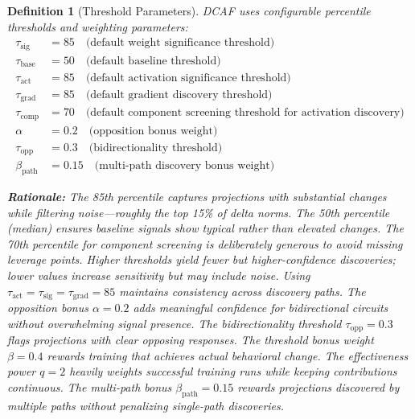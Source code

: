 \documentclass[11pt]{article}
\newtheorem{definition}{Definition}[section]
\begin{document}
\begin{definition}[Threshold Parameters]
\label{def:threshold-parameters}
DCAF uses configurable percentile thresholds and weighting parameters:
\begin{align}
\tau_{\text{sig}} &= 85 \quad \text{(default weight significance threshold)} \\
\tau_{\text{base}} &= 50 \quad \text{(default baseline threshold)} \\
\tau_{\text{act}} &= 85 \quad \text{(default activation significance threshold)} \\
\tau_{\text{grad}} &= 85 \quad \text{(default gradient discovery threshold)} \\
\tau_{\text{comp}} &= 70 \quad \text{(default component screening threshold for activation discovery)} \\
\alpha &= 0.2 \quad \text{(opposition bonus weight)} \\
\tau_{\text{opp}} &= 0.3 \quad \text{(bidirectionality threshold)} \\
\beta_{\text{path}} &= 0.15 \quad \text{(multi-path discovery bonus weight)}
\end{align}

\noindent\textbf{Rationale:} The 85th percentile captures projections with substantial changes while filtering noise---roughly the top 15\% of delta norms. The 50th percentile (median) ensures baseline signals show typical rather than elevated changes. The 70th percentile for component screening is deliberately generous to avoid missing leverage points. Higher thresholds yield fewer but higher-confidence discoveries; lower values increase sensitivity but may include noise. Using $\tau_{\text{act}} = \tau_{\text{sig}} = \tau_{\text{grad}} = 85$ maintains consistency across discovery paths. The opposition bonus $\alpha = 0.2$ adds meaningful confidence for bidirectional circuits without overwhelming signal presence. The bidirectionality threshold $\tau_{\text{opp}} = 0.3$ flags projections with clear opposing responses. The threshold bonus weight $\beta = 0.4$ rewards training that achieves actual behavioral change. The effectiveness power $q = 2$ heavily weights successful training runs while keeping contributions continuous. The multi-path bonus $\beta_{\text{path}} = 0.15$ rewards projections discovered by multiple paths without penalizing single-path discoveries.
\end{definition}
\end{document}

